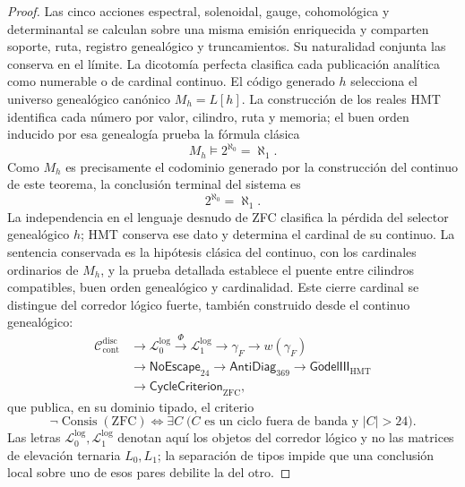 \begin{proof}
Las cinco acciones espectral, solenoidal, gauge, cohomológica y
determinantal se calculan sobre una misma emisión enriquecida y comparten
soporte, ruta, registro genealógico y truncamientos. Su naturalidad conjunta las conserva
en el límite. La dicotomía perfecta clasifica cada publicación analítica
como numerable o de cardinal continuo. El código generado \(h\) selecciona
el universo genealógico canónico \(M_h=L[h]\). La construcción de los
reales HMT identifica cada número por valor, cilindro, ruta y memoria; el
buen orden inducido por esa genealogía prueba la fórmula clásica
\[
M_h\models2^{\aleph_0}=\aleph_1.
\]
Como \(M_h\) es precisamente el codominio generado por la construcción del
continuo de este teorema, la conclusión terminal del sistema es
\[
 \boxed{2^{\aleph_0}=\aleph_1.}
\]
La independencia en el lenguaje desnudo de ZFC clasifica la pérdida del
selector genealógico \(h\); HMT conserva ese dato y determina el cardinal de
su continuo. La sentencia conservada es la hipótesis clásica del continuo,
con los cardinales ordinarios de \(M_h\), y la prueba detallada establece el
puente entre cilindros compatibles, buen orden genealógico y cardinalidad.
Este cierre cardinal se distingue del corredor lógico fuerte, también
construido desde el continuo genealógico:
\[
\begin{aligned}
 \mathcal C_{\mathrm{cont}}^{\mathrm{disc}}
 &\longrightarrow\mathcal L_0^{\mathrm{log}}
 \xrightarrow{\Phi}\mathcal L_1^{\mathrm{log}}
 \longrightarrow\gamma_F\longrightarrow w(\gamma_F)\\
 &\longrightarrow\mathsf{NoEscape}_{24}
 \longrightarrow\mathsf{AntiDiag}_{369}
 \longrightarrow\mathsf{G\ddot{o}delIII}_{\mathrm{HMT}}\\
 &\longrightarrow\mathsf{CycleCriterion}_{\mathrm{ZFC}},
\end{aligned}
\]
que publica, en su dominio tipado, el criterio
\[
 \boxed{
 \neg\operatorname{Consis}(\mathrm{ZFC})
 \Longleftrightarrow
 \exists C\;\bigl(C\text{ es un ciclo fuera de banda y }|C|>24\bigr).}
\]
Las letras \(\mathcal L_0^{\mathrm{log}},\mathcal L_1^{\mathrm{log}}\)
denotan aquí los objetos del corredor lógico y no las matrices de elevación
ternaria \(L_0,L_1\); la separación de tipos impide que una conclusión
local sobre uno de esos pares debilite la del otro.


\end{proof}
